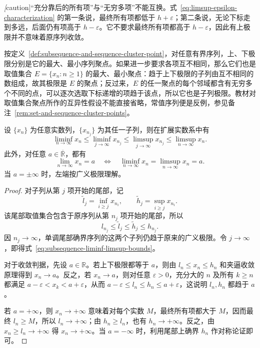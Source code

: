 \documentclass[UTF8,12pt,a4paper,fontset=fandol]{ctexbook}
\begin{document}
\emph[caution]{“充分靠后的所有项”与“无穷多项”不能互换。}式~\eqref{eq:limsup-epsilon-characterization} 的第一条说，最终所有项都低于 $h+\varepsilon$；第二条说，无论下标走到多远，后面仍有项高于 $h-\varepsilon$。它不要求最终所有项都高于 $h-\varepsilon$，因此有上极限并不意味着原序列收敛。

\begin{remark}
\label{rem:liminf-limsup-and-set-cluster-points}
按定义~\ref{def:subsequence-and-sequence-cluster-point}，对任意有界序列，上、下极限分别是它的最大、最小序列聚点。如果进一步要求各项互不相同，那么它们也是取值集合 $E=\{x_n:n\geq1\}$ 的最大、最小聚点：趋于上下极限的子列由互不相同的数组成，故其极限是 $E$ 的聚点；反过来，$E$ 的任一聚点的每个邻域都含有无穷多个不同的点，可以逐次选取下标递增的项趋于该点，所以它也是子列极限。教材对取值集合聚点所作的互异性假设不能直接省略，常值序列便是反例，参见备注~\ref{rem:set-and-sequence-cluster-points}。
\end{remark}

\begin{theorem}[子列的上下极限与收敛判据]
\label{thm:subsequence-limits-and-convergence}
设 $\{x_n\}$ 为任意实数列，$\{x_{n_j}\}$ 为其任一子列，则在扩展实数系中有
\begin{equation}
    \liminf_{n\to\infty}x_n
    \leq\liminf_{j\to\infty}x_{n_j}
    \leq\limsup_{j\to\infty}x_{n_j}
    \leq\limsup_{n\to\infty}x_n.
    \label{eq:subsequence-liminf-limsup-bounds}
\end{equation}
此外，对任意 $a\in\overline{\mathbb{R}}$，都有
\begin{equation}
    \lim_{n\to\infty}x_n=a
    \quad\Longleftrightarrow\quad
    \liminf_{n\to\infty}x_n=\limsup_{n\to\infty}x_n=a.
    \label{eq:convergence-via-liminf-limsup}
\end{equation}
当 $a=\pm\infty$ 时，左端按广义极限理解。
\end{theorem}

\begin{proof}
对子列从第 $j$ 项开始的尾部，记
\[
    \widetilde l_j=\inf_{i\geq j}x_{n_i},
    \qquad \widetilde h_j=\sup_{i\geq j}x_{n_i}.
\]
该尾部取值集合包含于原序列从第 $n_j$ 项开始的尾部，所以
\[
    l_{n_j}\leq\widetilde l_j\leq\widetilde h_j\leq h_{n_j}.
\]
因 $n_j\to\infty$，单调尾部确界序列的这两个子列仍趋于原来的广义极限。令 $j\to\infty$，即得式~\eqref{eq:subsequence-liminf-limsup-bounds}。

对于收敛判据，先设 $a\in\mathbb{R}$。若上下极限都等于 $a$，则由 $l_n\leq x_n\leq h_n$ 和夹逼收敛原理得到 $x_n\to a$。反之，若 $x_n\to a$，则对任意 $\varepsilon>0$，充分大的 $n$ 及所有 $k\geq n$ 都满足 $a-\varepsilon<x_k<a+\varepsilon$，从而 $a-\varepsilon\leq l_n\leq h_n\leq a+\varepsilon$，这说明 $l_n,h_n$ 都趋于 $a$。

若 $a=+\infty$，则 $x_n\to+\infty$ 意味着对每个实数 $M$，最终所有项都大于 $M$，因而最终 $l_n\geq M$，所以 $l_n\to+\infty$；由 $h_n\geq l_n$，也有 $h_n\to+\infty$。反之，由 $x_n\geq l_n\to+\infty$ 得 $x_n\to+\infty$。当 $a=-\infty$ 时，利用尾部上确界 $h_n$ 作对称论证即可。
\end{proof}
\end{document}
